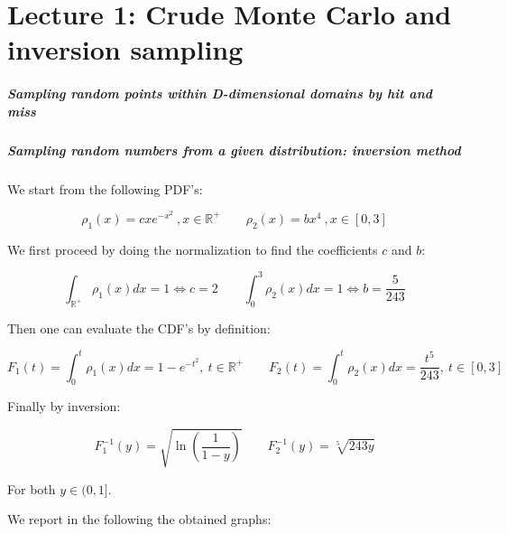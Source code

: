 \chapter*{Lecture 1: Crude Monte Carlo and inversion sampling}

\paragraph{Sampling random points within D-dimensional domains by hit and miss}



\paragraph{Sampling random numbers from a given distribution: inversion method}

We start from the following PDF's:

$$ \rho_1(x) = cxe^{-x^2}\ ,x \in \mathbb{R}^+ \qquad \rho_2(x) = bx^4\ , x \in [0,3]$$

We first proceed by doing the normalization to find the coefficients $c$ and $b$:

$$ \int_{\mathbb{R}^+}\rho_1(x)dx =1 \iff c=2 \qquad \int_{0}^3\rho_2(x)dx =1 \iff b = \frac{5}{243} $$

Then one can evaluate the CDF's by definition:

$$ F_1(t)=\int_{0}^t\rho_1(x)dx = 1-e^{-t^2}, \ t \in \mathbb{R}^+ \qquad F_2(t)=\int_{0}^t\rho_2(x)dx = \frac{t^5}{243}, \ t \in [0,3] $$

Finally by inversion:

$$ F^{-1}_1(y) = \sqrt{\ln\left(\frac{1}{1-y}\right)} \qquad F^{-1}_2(y)= \sqrt[5]{243 y}$$

For both $y \in (0,1]$.

We report in the following the obtained graphs:

